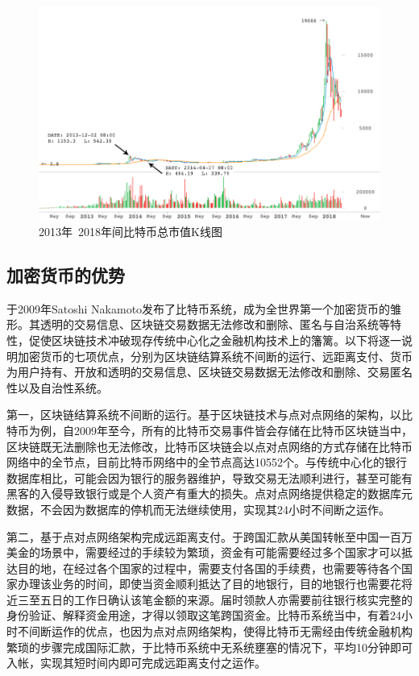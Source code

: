 			\begin{figure}[!htbp]
				\centering
				\includegraphics[width = 1\textwidth]{Thetotalmarketcapitalization.jpg}
				\caption{2013年~2018年间比特币总市值K线图\supercite{CryptocurrencyMarketCapitalizations}}\label{Thetotalmarketcapitalization}
			\end{figure}
		

			\subsection{加密货币的优势}
			于2009年Satoshi Nakamoto发布了比特币系统，成为全世界第一个加密货币的雏形。其透明的交易信息、区块链交易数据无法修改和删除、匿名与⾃治系统等特性，促使区块链技术冲破现存传统中⼼化之⾦融机构技术上的籓篱。以下将逐一说明加密货币的七项优点，分别为区块链结算系统不间断的运行、远距离支付、货币为用户持有、开放和透明的交易信息、区块链交易数据无法修改和删除、交易匿名性以及自治性系统。

				第一，区块链结算系统不间断的运行。基于区块链技术与点对点网络的架构，以比特币为例，自2009年至今，所有的比特币交易事件皆会存储在比特币区块链当中，区块链既无法删除也无法修改，比特币区块链会以点对点网络的方式存储在比特币网络中的全节点\supercite{YouReallyShouldRunaBitcoinFullNode:HeresWhy}，目前比特币网络中的全节点高达10552个。与传统中心化的银行数据库相比，可能会因为银行的服务器维护，导致交易无法顺利进行，甚至可能有黑客的入侵导致银行或是个人资产有重大的损失。点对点网络提供稳定的数据库元数据，不会因为数据库的停机而无法继续使用，实现其24小时不间断之运作。
				
				第二，基于点对点网络架构完成远距离支付。于跨国汇款从美国转帐至中国一百万美金的场景中，需要经过的手续较为繁琐，资金有可能需要经过多个国家才可以抵达目的地，在经过各个国家的过程中，需要支付各国的手续费，也需要等待各个国家办理该业务的时间，即使当资金顺利抵达了目的地银行，目的地银行也需要花将近三至五日的工作日确认该笔金额的来源。届时领款人亦需要前往银行核实完整的身份验证、解释资金用途，才得以领取这笔跨国资金。比特币系统当中，有着24小时不间断运作的优点，也因为点对点网络架构，使得比特币无需经由传统金融机构繁琐的步骤完成国际汇款，于比特币系统中无系统壅塞的情况下，平均10分钟即可入帐，实现其短时间内即可完成远距离支付之运作。

